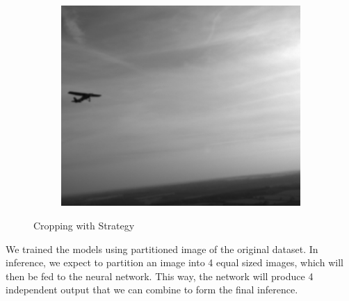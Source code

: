 {\begin{figure}[p]
\begin{subfigure}[][][t]{0.3\textwidth}
  \end{subfigure}\hfill
  \begin{subfigure}[][][t]{0.3\textwidth}
      \includegraphics[width=1\linewidth]{figures/crop_strat_legal3.png}
  \end{subfigure}
  \caption{Cropping with Strategy}
  \label{fig:crop-legal}
\end{figure}
}
We trained the models using partitioned image of the original dataset.
In inference, we expect to partition an image into 4 equal sized images, which will
then be fed to the neural network. This way, the network will produce 4 independent
output that we can combine to form the final inference.

